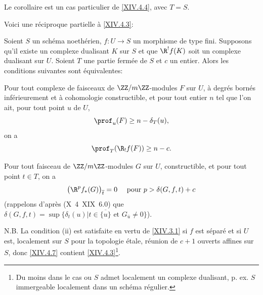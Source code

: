 Le corollaire est un cas particulier de \ref{XIV.4.4}, avec $T=S$.

Voici une r\'eciproque partielle \`a \ref{XIV.4.3}:

\begin{proposition} \label{XIV.4.7}
Soient $S$ un sch\'ema noeth\'erien, $f\colon U\to S$ un morphisme de type fini. Supposons qu'il existe un complexe dualisant $K$ sur $S$ et que $\R^{!}f(K)$ soit un complexe dualisant sur $U$. Soient $T$ une partie ferm\'ee de $S$ et $c$ un entier. Alors les conditions suivantes sont \'equivalentes:
\begin{enumeratei}
\item
Pour tout complexe de faisceaux de $\ZZ/m\ZZ$-modules $F$ sur $U$, \`a degr\'es born\'es inf\'erieurement et \`a cohomologie constructible, et pour tout entier $n$ tel que l'on ait, pour tout point $u$ de $U$,
$$
\prof_{u}(F)\geq n-\delta_{T}(u),
$$
on a
$$
\prof_{T}(\R_{!}f(F))\geq n-c.
$$

\item
Pour tout faisceau de $\ZZ/m\ZZ$-modules $G$ sur $U$, constructible, et pour tout point $t\in T$, on a
$$
\big(\R^{p}f_{\ast}(G)\big)_{\overline{t}}=0\quad\textrm{ pour }p>\delta(G, f, t)+c$$
(rappelons d'apr\`es (\textup{\SGA X~4~XIX~6.0}) que $\delta(G, f, t)=\sup\{ \delta_{t}(u)|t\in\overline{\{ u\} }\textrm{ et }G_{\overline{u}}\neq 0\}$).
\end{enumeratei}
\end{proposition}

N.B. La condition \textup{(ii)} est satisfaite en vertu de \ref{XIV.3.1} si $f$ est s\'epar\'e et si $U$ est, localement sur $S$ pour la topologie \'etale, r\'eunion de $c+1$ ouverts affines sur $S$, donc \ref{XIV.4.7} contient \ref{XIV.4.3}\footnote{Du moins dans le cas ou $S$ admet localement un complexe dualisant, p. ex. $S$ immergeable localement dans un sch\'ema r\'egulier.}.


